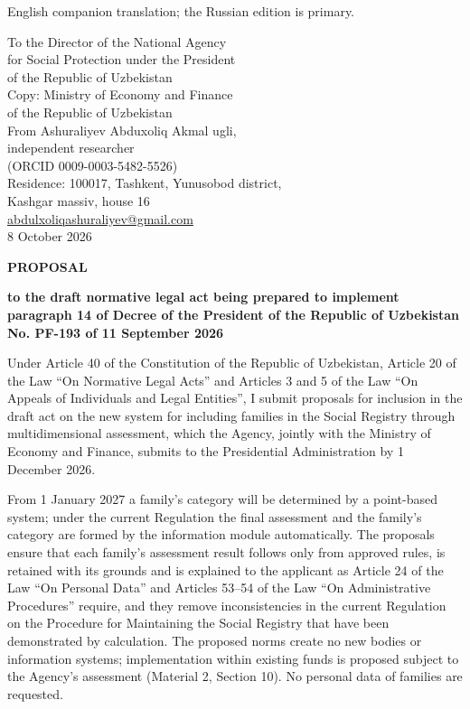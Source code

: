 \documentclass[14pt,a4paper]{extarticle}
\begin{document}
\noindent English companion translation; the Russian edition is primary.
\begin{flushright}
To the Director of the National Agency\\
for Social Protection under the President\\
of the Republic of Uzbekistan\\[2mm]
Copy: Ministry of Economy and Finance\\
of the Republic of Uzbekistan\\[4mm]
From Ashuraliyev Abduxoliq Akmal ugli,\\
independent researcher\\
(ORCID 0009-0003-5482-5526)\\
Residence: 100017, Tashkent, Yunusobod district,\\
Kashgar massiv, house 16\\
\href{mailto:abdulxoliqashuraliyev@gmail.com}{abdulxoliqashuraliyev@gmail.com}\\[2mm]
8 October 2026
\end{flushright}

\begin{center}\textbf{PROPOSAL}\par
\textbf{to the draft normative legal act being prepared to implement paragraph 14 of Decree of the President of the Republic of Uzbekistan No. PF-193 of 11 September 2026}\end{center}

Under Article 40 of the Constitution of the Republic of Uzbekistan, Article 20 of the Law “On Normative Legal Acts” and Articles 3 and 5 of the Law “On Appeals of Individuals and Legal Entities”, I submit proposals for inclusion in the draft act on the new system for including families in the Social Registry through multidimensional assessment, which the Agency, jointly with the Ministry of Economy and Finance, submits to the Presidential Administration by 1 December 2026.

From 1 January 2027 a family’s category will be determined by a point-based system; under the current Regulation the final assessment and the family’s category are formed by the information module automatically. The proposals ensure that each family’s assessment result follows only from approved rules, is retained with its grounds and is explained to the applicant as Article 24 of the Law “On Personal Data” and Articles 53–54 of the Law “On Administrative Procedures” require, and they remove inconsistencies in the current Regulation on the Procedure for Maintaining the Social Registry that have been demonstrated by calculation. The proposed norms create no new bodies or information systems; implementation within existing funds is proposed subject to the Agency’s assessment (Material 2, Section 10). No personal data of families are requested.
\end{document}
